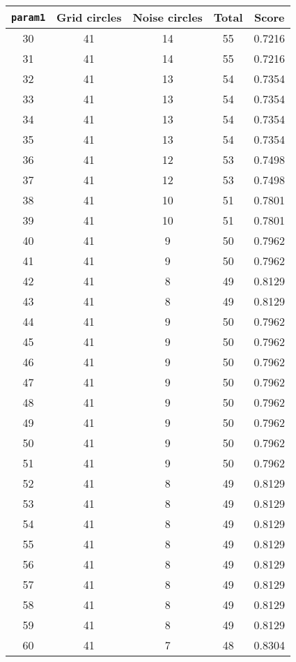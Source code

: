 \documentclass[letterpaper, 12pt]{article}
\begin{document}
\begin{longtable}{|c|c|c|c|c|}
\hline
\textbf{\texttt{param1}} & \textbf{Grid circles} & \textbf{Noise circles} & \textbf{Total} & \textbf{Score} \\
\hline
30 & 41 & 14 & 55 & 0.7216 \\
\hline
31 & 41 & 14 & 55 & 0.7216 \\
\hline
32 & 41 & 13 & 54 & 0.7354 \\
\hline
33 & 41 & 13 & 54 & 0.7354 \\
\hline
34 & 41 & 13 & 54 & 0.7354 \\
\hline
35 & 41 & 13 & 54 & 0.7354 \\
\hline
36 & 41 & 12 & 53 & 0.7498 \\
\hline
37 & 41 & 12 & 53 & 0.7498 \\
\hline
38 & 41 & 10 & 51 & 0.7801 \\
\hline
39 & 41 & 10 & 51 & 0.7801 \\
\hline
40 & 41 & 9 & 50 & 0.7962 \\
\hline
41 & 41 & 9 & 50 & 0.7962 \\
\hline
42 & 41 & 8 & 49 & 0.8129 \\
\hline
43 & 41 & 8 & 49 & 0.8129 \\
\hline
44 & 41 & 9 & 50 & 0.7962 \\
\hline
45 & 41 & 9 & 50 & 0.7962 \\
\hline
46 & 41 & 9 & 50 & 0.7962 \\
\hline
47 & 41 & 9 & 50 & 0.7962 \\
\hline
48 & 41 & 9 & 50 & 0.7962 \\
\hline
49 & 41 & 9 & 50 & 0.7962 \\
\hline
50 & 41 & 9 & 50 & 0.7962 \\
\hline
51 & 41 & 9 & 50 & 0.7962 \\
\hline
52 & 41 & 8 & 49 & 0.8129 \\
\hline
53 & 41 & 8 & 49 & 0.8129 \\
\hline
54 & 41 & 8 & 49 & 0.8129 \\
\hline
55 & 41 & 8 & 49 & 0.8129 \\
\hline
56 & 41 & 8 & 49 & 0.8129 \\
\hline
57 & 41 & 8 & 49 & 0.8129 \\
\hline
58 & 41 & 8 & 49 & 0.8129 \\
\hline
59 & 41 & 8 & 49 & 0.8129 \\
\hline
60 & 41 & 7 & 48 & 0.8304 \\
\hline

\end{longtable}
\end{document}
